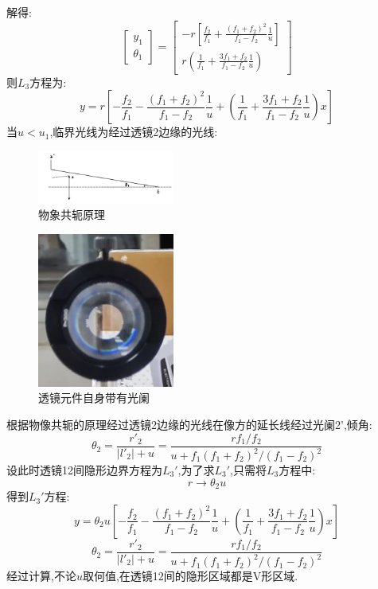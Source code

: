 \documentclass[UTF8]{gapd}
\begin{document}
解得:
\begin{equation}
  \begin{bmatrix}
      y_1\\
      \theta_1
  \end{bmatrix}=\begin{bmatrix}
      -r[\frac{f_2}{f_1}+\frac{(f_1+f_2)^2}{f_1-f_2}\frac{1}{u}   ]\\
      r(\frac{1}{f_1}+ \frac{3f_1+f_2}{f_1-f_2}\frac{1}{u}  )
  \end{bmatrix}
\end{equation}
则$L_3$方程为:
\begin{equation}
  y=r[-\frac{f_2}{f_1}-\frac{(f_1+f_2)^2}{f_1-f_2}\frac{1}{u}  + (\frac{1}{f_1}+ \frac{3f_1+f_2}{f_1-f_2}\frac{1}{u}  )x]
\end{equation}
当$u<u_1$,临界光线为经过透镜2边缘的光线:
\begin{figure}
  \centering
  \includegraphics[width=0.4\textwidth]{images/9.jpg}
  \caption{物象共轭原理}
  \label{fig:9}
\end{figure}
\begin{figure}
  \centering
  \includegraphics[width=0.4\textwidth]{images/10.jpg}
  \caption{透镜元件自身带有光阑}
  \label{fig:10}
\end{figure}
根据物像共轭的原理经过透镜2边缘的光线在像方的延长线经过光阑2',倾角:
\begin{equation}
  \theta_2=\frac{r'_2}{|l'_2|+u} =\frac{rf_1/f_2}{u+f_1(f_1+f_2)^2/(f_1-f_2)^2} 
\end{equation}
设此时透镜12间隐形边界方程为$L_3'$,为了求$L_3'$,只需将$L_3$方程中:
\begin{equation}
  r\rightarrow \theta_2 u
\end{equation}
得到$L_3'$方程:
\begin{equation}
  y=\theta_2u[-\frac{f_2}{f_1}-\frac{(f_1+f_2)^2}{f_1-f_2}\frac{1}{u}  + (\frac{1}{f_1}+ \frac{3f_1+f_2}{f_1-f_2}\frac{1}{u}  )x]
\end{equation}
\begin{equation}
  \theta_2=\frac{r'_2}{|l'_2|+u} =\frac{rf_1/f_2}{u+f_1(f_1+f_2)^2/(f_1-f_2)^2} 
\end{equation}
经过计算,不论$u$取何值,在透镜12间的隐形区域都是V形区域.
\end{document}
